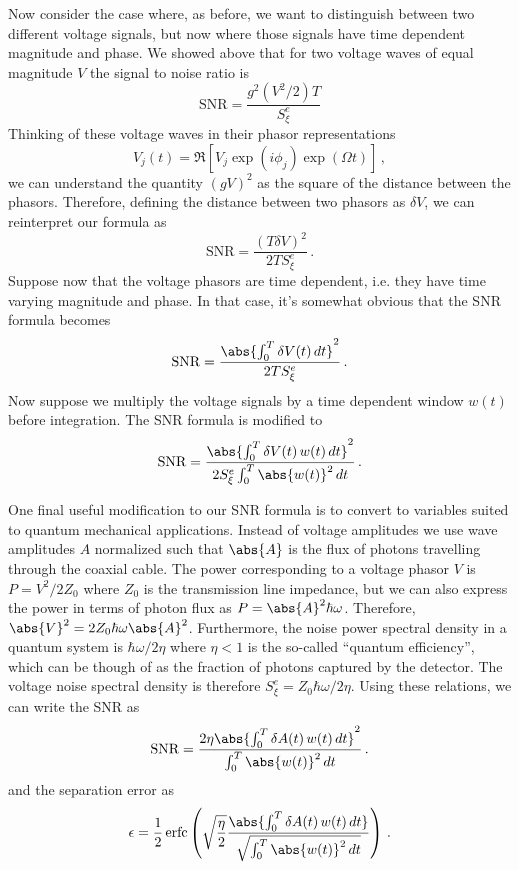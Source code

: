 
Now consider the case where, as before, we want to distinguish between two different voltage signals, but now where those signals have time dependent magnitude and phase.
We showed above that for two voltage waves of equal magnitude $V$ the signal to noise ratio is
\begin{equation*}
  \text{SNR} = \frac{g^2 (V^2 / 2) T}{S_\xi^e}
\end{equation*}
Thinking of these voltage waves in their phasor representations
\begin{equation*}
  V_j(t)
  = \Re \left[ V_j \exp(i \phi_j) \exp(\Omega t) \right]
  \, ,
\end{equation*}
we can understand the quantity $(g V)^2$ as the square of the distance between the phasors.
Therefore, defining the distance between two phasors as $\delta V$, we can reinterpret our formula as
\begin{equation*}
  \text{SNR} = \frac{\left( T \delta V \right)^2 }{2 T S_\xi^e} \, .
\end{equation*}
Suppose now that the voltage phasors are time dependent, i.e. they have time varying magnitude and phase.
In that case, it's somewhat obvious that the SNR formula becomes
\begin{equation*}
  \text{SNR} = \frac{\abs{\int_0^T \delta V(t) \, dt}^2}{2 T S_\xi^e} \, .
\end{equation*}
Now suppose we multiply the voltage signals by a time dependent window $w(t)$ before integration.
The SNR formula is modified to
\begin{equation*}
  \text{SNR} = \frac{\abs{\int_0^T \delta V(t) \, w(t) \, dt}^2}{2 S_\xi^e \int_0^T \abs{w(t)}^2 \, dt} \, .
\end{equation*}

One final useful modification to our SNR formula is to convert to variables suited to quantum mechanical applications.
Instead of voltage amplitudes we use wave amplitudes $A$ normalized such that $\abs{A}$ is the flux of photons travelling through the coaxial cable.
The power corresponding to a voltage phasor $V$ is $P = V^2 / 2 Z_0$ where $Z_0$ is the transmission line impedance, but we can also express the power in terms of photon flux as $P = \abs{A}^2 \hbar \omega$.
Therefore, $\abs{V}^2 = 2 Z_0 \hbar \omega \abs{A}^2$.
Furthermore, the noise power spectral density in a quantum system is $\hbar \omega / 2 \eta$ where $\eta < 1$ is the so-called ``quantum efficiency'', which can be though of as the fraction of photons captured by the detector.
The voltage noise spectral density is therefore $S_\xi^e = Z_0 \hbar \omega / 2 \eta$.
Using these relations, we can write the SNR as
\begin{equation}
  \text{SNR}
  = \frac
    {2 \eta \abs{\int_0^T \delta A(t) \, w(t) \, dt}^2}
    {\int_0^T \abs{w(t)}^2 \, dt} \, .
\end{equation}
and the separation error as
\begin{equation}
  \epsilon = \frac{1}{2} \, \text{erfc} \left(
    \sqrt{\frac{\eta}{2}} \frac
      {\abs{\int_0^T \delta A(t) \, w(t) \, dt }}
      {\sqrt{\int_0^T \abs{w(t)}^2 \, dt}}
  \right)
  \, .
\end{equation}
